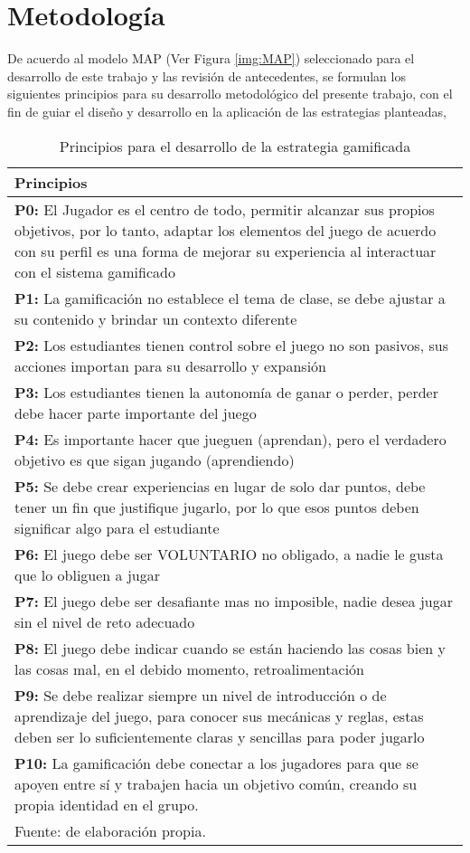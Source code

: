 %
\section{Metodología}

De acuerdo al modelo MAP (Ver Figura \ref{img:MAP}) seleccionado para el desarrollo de este trabajo y las 
revisión de antecedentes, se formulan los siguientes principios para su desarrollo metodológico del presente
trabajo, con el fin de guiar el diseño y desarrollo en la aplicación de las estrategias planteadas,

\begin{table}[ht]
\caption{Principios para el desarrollo de la estrategia gamificada}
\label{tab:principios}
\begin{center}
	\begin{tabular}{ p{150mm}}
\toprule
\textbf{Principios} \\ 
\midrule
\textbf{P0:} El Jugador es el centro de todo, permitir alcanzar sus propios objetivos, por lo tanto, adaptar 
los elementos del juego de acuerdo con su perfil es una forma de mejorar su experiencia al interactuar con el 
sistema gamificado \cite{Klock2020}\\
\textbf{P1:} La gamificación no establece el tema de clase, se debe ajustar a su contenido y brindar un 
contexto diferente\\
\textbf{P2:} Los estudiantes tienen control sobre el juego no son pasivos, sus acciones importan para su
desarrollo y expansión\\
\textbf{P3:} Los estudiantes tienen la autonomía de ganar o perder, perder debe hacer parte importante del 
juego\\
\textbf{P4:} Es importante hacer que jueguen (aprendan), pero el verdadero objetivo es que sigan jugando
(aprendiendo)\\
\textbf{P5:} Se debe crear experiencias en lugar de solo dar puntos, debe tener un fin que justifique 
jugarlo, por lo que esos puntos deben significar algo para el estudiante\\
\textbf{P6:} El juego debe ser VOLUNTARIO no obligado, a nadie le gusta que lo obliguen a jugar\\
\textbf{P7:} El juego debe ser desafiante mas no imposible, nadie desea jugar sin el nivel de reto adecuado\\
\textbf{P8:} El juego debe indicar cuando se están haciendo las cosas bien y las cosas mal, en el debido 
momento, retroalimentación\\
\textbf{P9:} Se debe realizar siempre un nivel de introducción o de aprendizaje del juego, para conocer sus 
mecánicas y reglas, estas deben ser lo suficientemente claras y sencillas para poder jugarlo\\
\textbf{P10:} La gamificación debe conectar a los jugadores para que se apoyen entre sí y trabajen hacia un 
objetivo común, creando su propia identidad en el grupo.\\
\bottomrule
{\footnotesize Fuente: de elaboración propia.}
\end{tabular}
\end{center}
\end{table}

